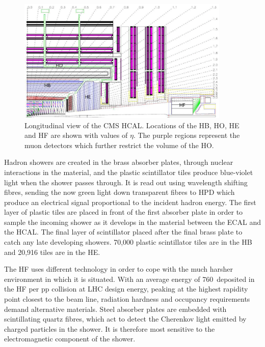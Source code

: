 \begin{figure}[htbp]
  \begin{center}
  \includegraphics[width=0.9\textwidth]{Figures/detector/cmsHCAL}
  \caption{Longitudinal view of the \ac{CMS} \ac{HCAL}. Locations of the \ac{HB}, \ac{HO}, \ac{HE} and \ac{HF} are shown with values of $\eta$. The purple regions represent the muon detectors which further restrict the volume of the \ac{HO}.
}
  \label{fig:CMShcal}
  \end{center}
\end{figure}

Hadron showers are created in the brass absorber plates, through nuclear interactions in the material, and the plastic scintillator tiles produce blue-violet light when the shower passes through. 
It is read out using wavelength shifting fibres, sending the now green light down transparent fibres to \ac{HPD} which produce an electrical signal proportional to the incident hadron energy.
The first layer of plastic tiles are placed in front of the first absorber plate in order to sample the incoming shower as it develops in the material between the \ac{ECAL} and the \ac{HCAL}.
The final layer of scintillator placed after the final brass plate to catch any late developing showers.
70,000 plastic scintillator tiles are in the \ac{HB} and 20,916 tiles are in the \ac{HE}.

The \ac{HF} uses different technology in order to cope with the much harsher environment in which it is situated.
With an average energy of 760~\GeV deposited in the \ac{HF} per pp collision at LHC design energy, peaking at the highest rapidity point closest to the beam line, radiation hardness and occupancy requirements demand alternative materials.
Steel absorber plates are embedded with scintillating quartz fibres, which act to detect the Cherenkov light emitted by charged particles in the shower. 
It is therefore most sensitive to the electromagnetic component of the shower.


